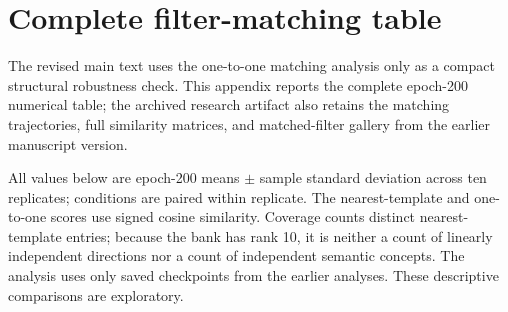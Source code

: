 \section{Complete filter-matching table}\label{app:kernel-matching}

The revised main text uses the one-to-one matching analysis only as a compact structural robustness check. This appendix reports the complete epoch-200 numerical table; the archived research artifact also retains the matching trajectories, full similarity matrices, and matched-filter gallery from the earlier manuscript version.

All values below are epoch-200 means $\pm$ sample standard deviation across ten replicates; conditions are paired within replicate. The nearest-template and one-to-one scores use signed cosine similarity. Coverage counts distinct nearest-template entries; because the bank has rank 10, it is neither a count of linearly independent directions nor a count of independent semantic concepts. The analysis uses only saved checkpoints from the earlier analyses. These descriptive comparisons are exploratory.

